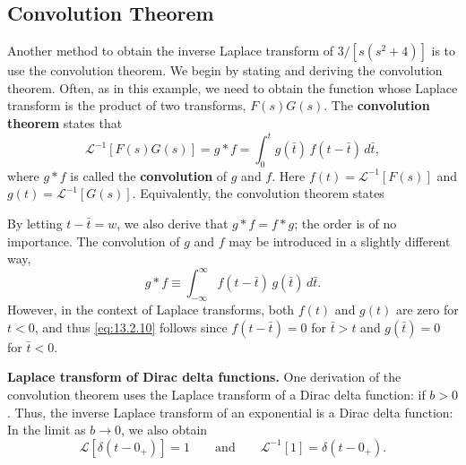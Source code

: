 \subsection{Convolution Theorem}
\label{sec:13.2.4}

Another method to obtain the inverse Laplace transform of $3/[s(s^2+4)]$ is to use the convolution theorem.  We begin by stating and deriving the convolution theorem.  Often, as in this example, we need to obtain the function whose Laplace transform is the product of two transforms, $F(s)G(s)$.  The \textbf{convolution theorem} states that
\begin{equation}
\mathcal{L}^{-1}[F(s)G(s)] = g * f = \int_0^{t} g(\bar{t})\,f(t-\bar{t})\,d\bar{t},
\label{eq:13.2.10}
\end{equation}
where $g*f$ is called the \textbf{convolution} of $g$ and $f$.  Here $f(t) = \mathcal{L}^{-1}[F(s)]$ and $g(t) = \mathcal{L}^{-1}[G(s)]$.  Equivalently, the convolution theorem states

By letting $t - \bar{t} = w$, we also derive that $g*f = f*g$; the order is of no importance.
The convolution of $g$ and $f$ may be introduced in a slightly different way,
\[
g * f \equiv \int_{-\infty}^{\infty} f(t-\bar{t})\,g(\bar{t})\,d\bar{t}.
\]
However, in the context of Laplace transforms, both $f(t)$ and $g(t)$ are zero for $t < 0$, and thus \eqref{eq:13.2.10} follows since $f(t-\bar{t})=0$ for $\bar{t} > t$ and $g(\bar{t})=0$ for $\bar{t} < 0$.

\textbf{Laplace transform of Dirac delta functions.}
One derivation of the convolution theorem uses the Laplace transform of a Dirac delta function:
if $b > 0$.  Thus, the inverse Laplace transform of an exponential is a Dirac delta function:
In the limit as $b \to 0$, we also obtain
\begin{equation}
\mathcal{L}\left[\delta(t-0_+)\right] = 1 \qquad\text{and}\qquad
\mathcal{L}^{-1}[1] = \delta(t-0_+).
\label{eq:13.2.14}
\end{equation}

